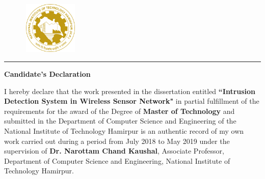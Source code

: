 \graphicspath{{Figures/PNG/}{Figures/}}
\vspace{-4.5\baselineskip}
\begin{figure}[htbp]
	\includegraphics[height=2.5cm,width=2.7cm]{NIT-Logo.png}
\end{figure}
\vspace{-5.0\baselineskip}
\begin{center} 
\end{center}
\noindent\rule{\linewidth}{2pt}
\begin{center}
{\bf\Large \hspace{1cm} Candidate's Declaration }\\
\par\vspace{5mm}
\end{center}
\noindent I hereby declare that the work presented in the dissertation entitled \textbf{``Intrusion Detection System in Wireless Sensor Network"} in partial fulfillment of the requirements for the award of the Degree of \textbf{Master of Technology} and submitted in the Department of Computer Science and Engineering of the National Institute of Technology Hamirpur is an authentic record of my own work carried out during a period from July 2018 to May 2019 under the supervision of  \textbf{Dr. Narottam Chand Kaushal}, Associate Professor, Department of Computer Science and Engineering, National Institute of Technology Hamirpur.
